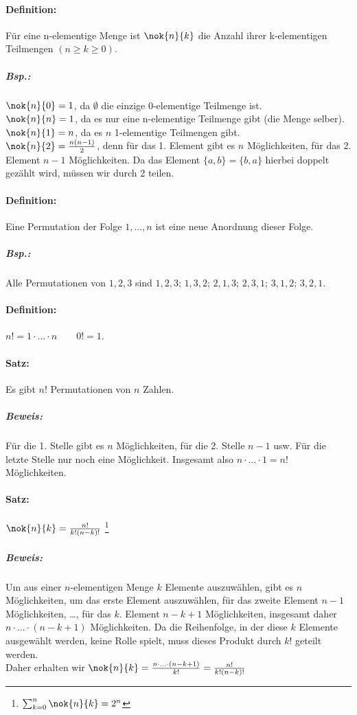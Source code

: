 \documentclass{scrreprt}
\begin{document}
\paragraph{Definition:} Für eine n-elementige Menge ist $\nok{n}{k}$ die Anzahl ihrer k-elementigen Teilmengen $(n\geq k \geq 0)$.

\subparagraph{Bsp.:} \parskp
$\nok{n}{0}=1$, da $\emptyset$ die einzige 0-elementige Teilmenge ist.\\
$\nok{n}{n}=1$, da es nur eine n-elementige Teilmenge gibt (die Menge selber).\\
$\nok{n}{1}=n$, da es $n$ 1-elementige Teilmengen gibt.\\
$\nok{n}{2}=\frac{n(n-1)}{2}$, denn für das 1. Element gibt es $n$ Möglichkeiten, für das 2. Element $n-1$ Möglichkeiten. Da das Element $\{a,b\}=\{b,a\}$ hierbei doppelt gezählt wird, müssen wir durch 2 teilen.

\paragraph{Definition:} Eine Permutation der Folge $1,...,n$ ist eine neue Anordnung dieser Folge.

\subparagraph{Bsp.:} Alle Permutationen von $1,2,3$ sind $1,2,3$; $1,3,2$; $2,1,3$; $2,3,1$; $3,1,2$; $3,2,1$.

\paragraph{Definition:} $n!=1\cdot ... \cdot n \qquad 0! =1$.
\paragraph{Satz:} Es gibt $n!$ Permutationen von $n$ Zahlen.

\subparagraph{Beweis:} Für die 1. Stelle gibt es $n$ Möglichkeiten, für die 2. Stelle $n-1$ usw. Für die letzte Stelle nur noch eine Möglichkeit. Insgesamt also $n\cdot ... \cdot 1=n!$ Möglichkeiten.

\paragraph{Satz:} $\nok{n}{k}= \frac{n!}{k! (n-k)!}$ \footnote{$\sum_{k=0}^{n}\nok{n}{k}=2^n$}
\subparagraph{Beweis:} Um aus einer $n$-elementigen Menge $k$ Elemente auszuwählen, gibt es $n$ Möglichkeiten, um das erste Element auszuwählen, für das zweite Element $n-1$ Möglichkeiten, …, für das $k$. Element $n-k+1$ Möglichkeiten, insgesamt daher $n \cdot ...\cdot (n-k+1)$ Möglichkeiten. Da die Reihenfolge, in der diese $k$ Elemente ausgewählt werden, keine Rolle spielt, muss dieses Produkt durch $k!$ geteilt werden. \\
Daher erhalten wir $\nok{n}{k}= \frac{n\cdot ...\cdot (n-k+1)}{k!}= \frac{n!}{k! (n-k)!}$
\end{document}
